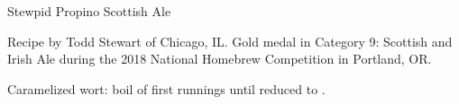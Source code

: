 \begin{recipe}{Stewpid Propino Scottish Ale} %

\begin{aboutblock}
Recipe by Todd Stewart of Chicago, IL. Gold medal in Category 9: Scottish and
Irish Ale during the 2018 National Homebrew Competition in Portland, OR.
\sourceaha
\end{aboutblock}


\begin{methodandtiming}

\begin{mashsteps}
\end{mashsteps}

\begin{fermentationsteps}
\end{fermentationsteps}

\begin{directions}
Caramelized wort: boil  of first runnings until reduced to .
\end{directions}

\end{methodandtiming}

\recipebreak

\begin{ingredientsblock}

\begin{malts}
\end{malts}

\begin{hops}
\end{hops}


\end{ingredientsblock}

\end{recipe}

